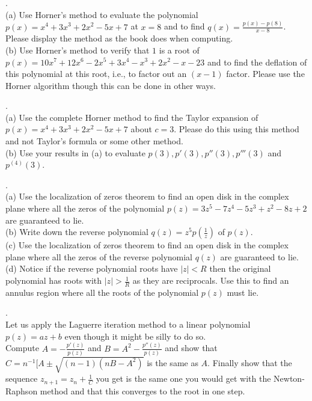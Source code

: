 \documentclass[12 pt]{article}
\begin{document}
\medskip

. \\
(a) Use Horner's method to evaluate the polynomial $p(x)=x^4 + 3x^3 + 2x^2 -5x + 7$ at $x=8$ and to find 
$q(x)=\frac{p(x)-p(8)}{x-8}$. Please display the method as the book does when computing. \\
(b) Use Horner's method to verify that $1$ is a root of $p(x)=10x^7+12x^6 - 2x^5 +3x^4-x^3+2x^2 -x - 23$ and 
to find the deflation of this polynomial at this root, i.e., to factor out an $(x-1)$ factor. Please use the Horner algorithm though 
this can be done in other ways. 

\medskip

. \\
(a) Use the complete Horner method to find the Taylor expansion of $p(x)=x^4+3x^3+2x^2-5x+7$ about $c=3$. 
Please do this using this method and not Taylor's formula or some other method. \\
(b) Use your results in (a) to evaluate $p(3), p'(3), p''(3), p'''(3)$ and $p^{(4)}(3)$.

\medskip

. \\
(a) Use the localization of zeros theorem to find an open disk in the complex plane where all the zeros of the 
polynomial $p(z)=3z^5-7z^4-5z^3+z^2-8z+2$ are guaranteed to lie. \\
(b) Write down the reverse polynomial $q(z)=z^5p(\frac{1}{z})$ of $p(z)$. \\
(c) Use the localization of zeros theorem to find an open disk in the complex plane where all the zeros of the 
reverse polynomial $q(z)$ are guaranteed to lie. \\
(d) Notice if the reverse polynomial roots have $|z| < R$ then the original polynomial has roots with $|z| > \frac{1}{R}$ as 
they are reciprocals. 
Use this to find an annulus region where all the roots of the polynomial $p(z)$ must lie. 

\medskip

. \\
Let us apply the Laguerre iteration method to a linear polynomial $p(z)=az+b$ even though it might be silly to do so. \\
Compute $A=-\frac{p'(z)}{p(z)}$ and $B=A^2-\frac{p''(z)}{p(z)}$ and show that 
$C=n^{-1}[A \pm \sqrt{(n-1)(nB-A^2)}$ is the same as $A$. Finally show that the sequence $z_{n+1}=z_n + \frac{1}{C}$ you get is the same one you would get with the 
Newton-Raphson method and that this converges to the root in one step. 
\end{document}
